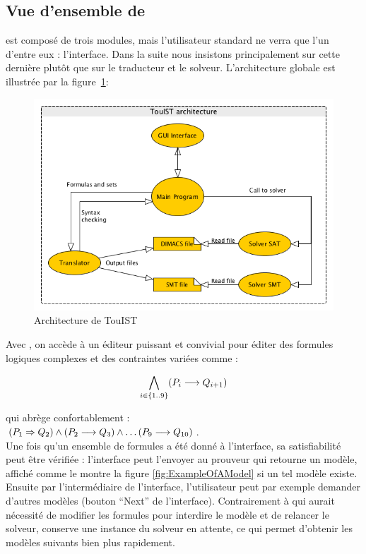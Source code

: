 \subsection{Vue d'ensemble de \touist}\label{sec:sat_interface}


\touist est composé de trois modules, mais l'utilisateur standard ne verra que l'un d'entre eux : l'interface. Dans la suite nous insistons principalement sur cette dernière plutôt que sur le traducteur et le solveur. L'architecture globale est illustrée par la figure~\ref{fig:architectureTouisT}: 

\begin{figure}[htbp]
\centering
\includegraphics[scale=0.37]{figures/DiagTouist.png}
  \caption{Architecture de TouIST}
  \label{fig:architectureTouisT}
\end{figure}

Avec \touist , on accède à un éditeur puissant et convivial pour éditer des formules logiques complexes et des contraintes variées comme :

$$\bigwedge_{i \in \{1..9\}} (P_i \longrightarrow Q_{i+1})$$

qui abrège confortablement :\\ 

$(P_1 \Rightarrow Q_2) \wedge (P_2 \longrightarrow Q_3) \wedge \ldots (P_9\longrightarrow Q_{10})$. 
\\

Une fois qu'un ensemble de formules a été donné à l'interface, sa satisfiabilité peut être vérifiée : l'interface peut l'envoyer au prouveur qui retourne un modèle, affiché comme le montre la figure \ref{fig:ExampleOfAModel} si un tel modèle existe. Ensuite par l'intermédiaire de l'interface, l'utilisateur peut par exemple demander d'autres modèles (bouton ``Next'' de l'interface). Contrairement à \satoulouse qui aurait nécessité de modifier les formules pour interdire le modèle et de relancer le solveur, \touist conserve une instance du solveur en attente, ce qui permet d'obtenir les modèles suivants bien plus rapidement.

